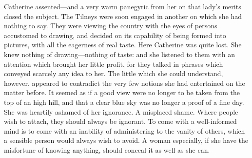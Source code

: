 Catherine assented---and a very warm panegyric from her on that lady's merits closed the subject. The Tilneys were soon engaged in another on which she had nothing to say. They were viewing the country with the eyes of persons accustomed to drawing, and decided on its capability of being formed into pictures, with all the eagerness of real taste. Here Catherine was quite lost. She knew nothing of drawing---nothing of taste: and she listened to them with an attention which brought her little profit, for they talked in phrases which conveyed scarcely any idea to her. The little which she could understand, however, appeared to contradict the very few notions she had entertained on the matter before. It seemed as if a good view were no longer to be taken from the top of an high hill, and that a clear blue sky was no longer a proof of a fine day. She was heartily ashamed of her ignorance. A misplaced shame. Where people wish to attach, they should always be ignorant. To come with a well-informed mind is to come with an inability of administering to the vanity of others, which a sensible person would always wish to avoid. A woman especially, if she have the misfortune of knowing anything, should conceal it as well as she can.

